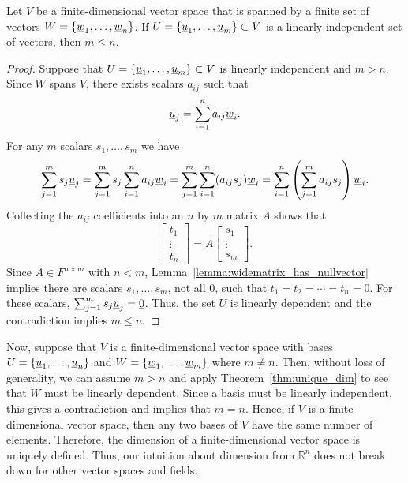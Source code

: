 \begin{theorem} \label{thm:unique_dim}
Let $V$ be a finite-dimensional  vector space that is spanned by a finite set of vectors $W = \left\{ \underline{w}_1, \ldots, \underline{w}_n \right\}$.
If $U = \left\{ \underline{u}_1, \ldots, \underline{u}_m \right\} \subset V$ is a linearly independent set of vectors, then $m\leq n$.
\end{theorem}
\begin{proof}
Suppose that $U = \left\{ \underline{u}_1, \ldots, \underline{u}_m \right\} \subset V$ is linearly independent and $m > n$.
Since $W$ spans $V$, there exists scalars $a_{ij}$ such that
\begin{equation*}
\underline{u}_j = \sum_{i=1}^n a_{ij} \underline{w}_i.
\end{equation*}
For any $m$ scalars $s_1, \ldots, s_m$ we have
\begin{equation*}
\sum_{j=1}^m s_j \underline{u}_j
= \sum_{j=1}^m s_j \sum_{i=1}^n a_{ij} \underline{w}_i
= \sum_{j=1}^m \sum_{i=1}^n ( a_{ij} s_j ) \underline{w}_i
= \sum_{i=1}^n \left( \sum_{j=1}^m a_{ij} s_j \right) \underline{w}_i . 
\end{equation*}
Collecting the $a_{ij}$ coefficients into an $n$ by $m$ matrix $A$ shows that
\begin{equation*}
\begin{bmatrix} t_1 \\ \vdots \\ t_n \end{bmatrix} = A \begin{bmatrix} s_1 \\ \vdots \\ s_m \end{bmatrix} .
\end{equation*}
Since $A\in F^{n\times m}$ with $n<m$, Lemma~\ref{lemma:widematrix_has_nullvector} implies there are scalars $s_1, \ldots, s_m$, not all $0$, such that $t_1 = t_2 = \cdots = t_n = 0$.
For these scalars, $\sum_{j=1}^m s_j \underline{u}_j = \underline{0}$.
Thus, the set $U$ is linearly dependent and the contradiction implies $m \leq n$.
\end{proof}

Now, suppose that $V$ is a finite-dimensional vector space with bases $U=\{\underline{u}_1, \ldots, \underline{u}_n\}$ and $W =\{\underline{w}_1, \ldots, \underline{w}_m\}$ where $m \neq n$.
Then, without loss of generality, we can assume $m > n$ and apply Theorem~\ref{thm:unique_dim} to see that $W$ must be linearly dependent.
Since a basis must be linearly independent, this gives a contradiction and implies that $m = n$.
Hence, if $V$ is a finite-dimensional vector space, then any two bases of $V$ have the same number of elements.
Therefore, the dimension of a finite-dimensional vector space is uniquely defined.
Thus, our intuition about dimension from $\mathbb{R}^n$ does not break down for other vector spaces and fields.

